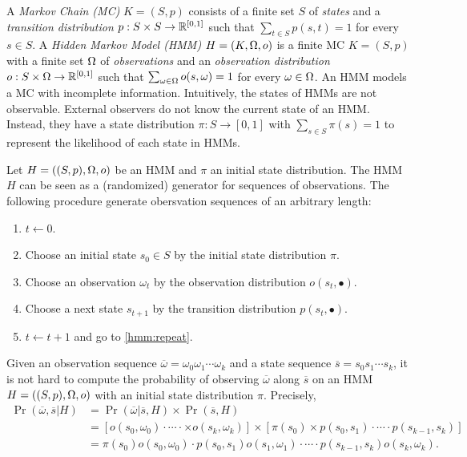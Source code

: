 
A \emph{Markov Chain (MC)} $K = (S, p)$ consists of a finite set $S$ of
\emph{states} and a \emph{transition distribution} $p : S \times S
\rightarrow \mathbb{R}^{[0, 1]}$ such that $\sum_{t \in S} p (s, t) = 1$ for every
$s \in S$.
A \emph{Hidden Markov Model (HMM)} $H = (K, \Omega, o)$ is a finite MC $K =
(S, p)$ with a finite set $\Omega$ of \emph{observations} and an
\emph{observation distribution} $o : S \times \Omega \rightarrow \mathbb{R}^{[0, 1]}$
such that $\sum_{\omega \in \Omega} o (s, \omega) = 1$ for every $\omega \in
\Omega$. An HMM models a MC with incomplete information. Intuitively,
the states of HMMs are not observable. External observers do not know
the current state of an HMM. Instead, they have a state distribution
$\pi : S \rightarrow [0, 1]$ with $\sum_{s \in S} \pi (s) = 1$
to represent the likelihood of each state in HMMs.

Let $H = ((S, p), \Omega, o)$ be an HMM and $\pi$ an initial state
distribution. The HMM $H$ can be seen as a (randomized) generator for
sequences of observations. The following procedure generate
obersvation sequences of an arbitrary length:
\begin{enumerate}
\item $t \leftarrow 0$.
\item Choose an initial state $s_0 \in S$ by the initial state
  distribution $\pi$.
\item \label{hmm:repeat}
  Choose an observation $\omega_t$ by the observation distribution
  $o (s_t, \bullet)$.
\item Choose a next state $s_{t+1}$ by the transition distribution
  $p (s_t, \bullet)$.
\item $t \leftarrow t + 1$ and go to \ref{hmm:repeat}.
\end{enumerate}

Given an observation sequence $\overline{\omega} =
\omega_0\omega_1\cdots\omega_k$ and a state sequence $\overline{s} =
s_0s_1\cdots s_k$, it is not hard to compute the probability of
observing $\overline{\omega}$ along $\overline{s}$ on an HMM $H = ((S,
p), \Omega, o)$ with an initial state distribution $\pi$. Precisely,
\begin{align}
  \Pr (\overline{\omega}, \overline{s} | H)
  & = \Pr (\overline{\omega} | \overline{s}, H) \times \Pr(\overline{s}, H)
    \nonumber
  \\
  & = [o (s_0, \omega_0) \cdot \cdots \cdot
    \times o (s_k, \omega_k)] \times
      [\pi (s_0) \times p (s_0, s_1) \cdot \cdots
    \cdot p (s_{k-1}, s_k)] 
    \nonumber
  \\
  & = \pi (s_0) o (s_0, \omega_0) \cdot
    p (s_0, s_1) o (s_1, \omega_1) \cdot \cdots \cdot
    p (s_{k-1}, s_k) o (s_k, \omega_k).
    \label{eqn:prob-obs-state}
\end{align}

